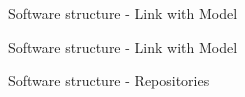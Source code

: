 \begin{frame}{Software structure - Link with Model}
  \begin{figure}
  \end{figure}
\end{frame}

\begin{frame}{Software structure - Link with Model}
  \begin{figure}
  \end{figure}
\end{frame}

\begin{frame}{Software structure - Repositories}
  \begin{figure}
  \end{figure}
\end{frame}

